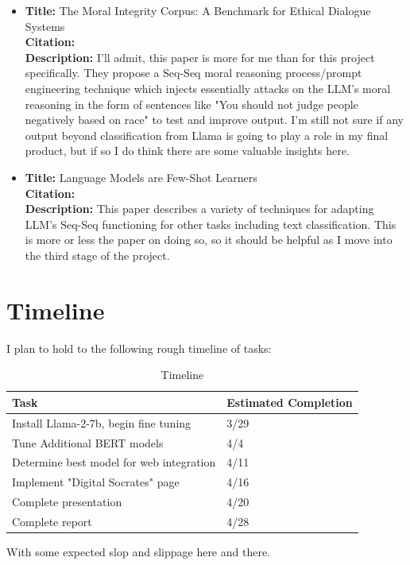 \documentclass[11pt,a4paper]{article}
\begin{document}
\begin{itemize}
    \item\textbf{Title:} The Moral Integrity Corpus: A Benchmark for Ethical Dialogue Systems\\
    \textbf{Citation:} \cite{ziems2022moral} \\
    \textbf{Description:} I'll admit, this paper is more for me than for this project specifically. They propose a Seq-Seq moral reasoning process/prompt engineering technique which injects essentially attacks on the LLM's moral reasoning in the form of sentences like "You should not judge people negatively based on race" to test and improve output. I'm still not sure if any output beyond classification from Llama is going to play a role in my final product, but if so I do think there are some valuable insights here. 

    \item\textbf{Title:} Language Models are Few-Shot Learners\\
    \textbf{Citation:} \cite{brown2020language} \\
    \textbf{Description:} This paper describes a variety of techniques for adapting LLM's Seq-Seq functioning for other tasks including text classification. This is more or less the paper on doing so, so it should be helpful as I move into the third stage of the project.
\end{itemize}

\section{Timeline}

I plan to hold to the following rough timeline of tasks:

\begin{table}[htbp]
    \centering
    \begin{tabular}{p{} p{}}
        \toprule
        \textbf{Task} & \textbf{Estimated Completion} \\
        \midrule
        Install Llama-2-7b, begin fine tuning & 3/29 \\
        \midrule
        Tune Additional BERT models & 4/4 \\
        \midrule
        Determine best model for web integration & 4/11 \\
        \midrule
        Implement "Digital Socrates" page & 4/16 \\
        \midrule
        Complete presentation & 4/20 \\
        \midrule
        Complete report & 4/28
        \bottomrule
    \end{tabular}
    \caption{Timeline}
    \label{tab:task_completion}
\end{table}

With some expected slop and slippage here and there.



\end{document}
